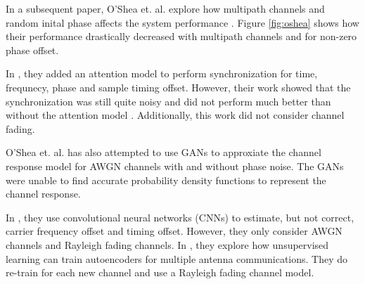 In a subsequent paper, O'Shea et. al. explore how multipath channels and random inital phase affects the system performance \cite{osheaatt}.  Figure \ref{fig:oshea} shows how their performance drastically decreased with multipath channels and for non-zero phase offset.

In \cite{osheasynch}, they added an attention model to perform synchronization for time, frequnecy, phase and sample timing offset.  However, their work showed that the synchronization was still quite noisy and did not perform much better than without the attention model \cite{osheaatt}.  Additionally, this work did not consider channel fading. 

O'Shea et. al. has also attempted to use GANs to approxiate the channel response model for AWGN channels with and without phase noise\cite{osheavoid}.  The GANs were unable to find accurate probability density functions to represent the channel response.  

In \cite{osheacsi}, they use convolutional neural networks (CNNs) to estimate, but not correct, carrier frequency offset and timing offset.  However, they only consider AWGN channels and Rayleigh fading channels.  
In \cite{osheamimo}, they explore how unsupervised learning can train autoencoders for multiple antenna communications.  They do re-train for each new channel and use a Rayleigh fading channel model.